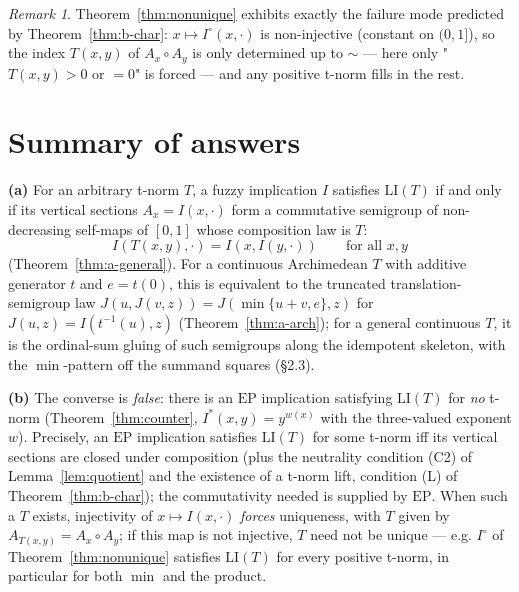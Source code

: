 \documentclass{amsart}
\theoremstyle{definition}
\theoremstyle{remark}
\newtheorem{remark}{Remark}
\newcommand{\zo}{[0,1]}
\newcommand{\LI}{\mathrm{LI}}
\newcommand{\EP}{\mathrm{EP}}
\newcommand{\Ax}{A}
\begin{document}
\begin{remark}
Theorem~\ref{thm:nonunique} exhibits exactly the failure mode predicted by
Theorem~\ref{thm:b-char}: $x\mapsto I^{\circ}(x,\cdot)$ is non-injective (constant on
$(0,1]$), so the index $T(x,y)$ of $\Ax_x\circ\Ax_y$ is only determined up to $\sim$ --- here
only "$T(x,y)>0$ or $=0$" is forced --- and any positive t-norm fills in the rest.
\end{remark}

\section{Summary of answers}

\textbf{(a)} For an arbitrary t-norm $T$, a fuzzy implication $I$ satisfies $\LI(T)$ if and
only if its vertical sections $\Ax_x=I(x,\cdot)$ form a commutative semigroup of
non-decreasing self-maps of $\zo$ whose composition law is $T$:
\[
I(T(x,y),\cdot)=I(x,I(y,\cdot))\qquad\text{for all }x,y
\]
(Theorem~\ref{thm:a-general}). For a continuous Archimedean $T$ with additive generator $t$
and $e=t(0)$, this is equivalent to the truncated translation-semigroup law
$J(u,J(v,z))=J(\min\{u+v,e\},z)$ for $J(u,z)=I(t^{-1}(u),z)$ (Theorem~\ref{thm:a-arch}); for a
general continuous $T$, it is the ordinal-sum gluing of such semigroups along the idempotent
skeleton, with the $\min$-pattern off the summand squares (\S2.3).

\textbf{(b)} The converse is \emph{false}: there is an $\EP$ implication satisfying $\LI(T)$
for \emph{no} t-norm (Theorem~\ref{thm:counter}, $I^{\ast}(x,y)=y^{w(x)}$ with the three-valued
exponent $w$). Precisely, an $\EP$ implication satisfies $\LI(T)$ for some t-norm iff its
vertical sections are closed under composition (plus the neutrality
condition (C2) of Lemma~\ref{lem:quotient} and the existence of a t-norm lift, condition (L) of
Theorem~\ref{thm:b-char}); the commutativity needed is supplied by
$\EP$. When such a $T$ exists, injectivity of $x\mapsto I(x,\cdot)$ \emph{forces} uniqueness, with
$T$ given by $\Ax_{T(x,y)}=\Ax_x\circ\Ax_y$; if this map is not injective,
$T$ need not be unique --- e.g. $I^{\circ}$ of Theorem~\ref{thm:nonunique} satisfies $\LI(T)$
for every positive t-norm, in particular for both $\min$ and the product.
\end{document}

